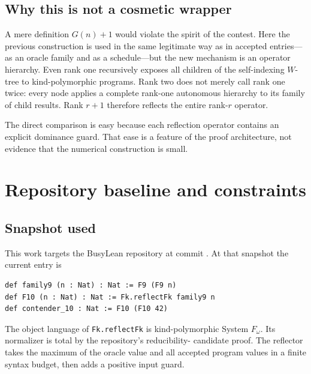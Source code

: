 \documentclass[11pt,oneside]{article}
\theoremstyle{definition}
\newcommand{\code}[1]{\texttt{#1}}
\newcommand{\BusyLean}{\textsf{BusyLean}}
\begin{document}
\subsection{Why this is not a cosmetic wrapper}

A mere definition $G(n)+1$ would violate the spirit of the contest.  Here the
previous construction is used in the same legitimate way as in accepted
entries---as an oracle family and as a schedule---but the new mechanism is an
operator hierarchy.  Even rank one recursively exposes all children of the
self-indexing $W$-tree to kind-polymorphic programs.  Rank two does not merely
call rank one twice: every node applies a complete rank-one autonomous
hierarchy to its family of child results.  Rank $r+1$ therefore reflects the
entire rank-$r$ operator.

The direct comparison is easy because each reflection operator contains an
explicit dominance guard.  That ease is a feature of the proof architecture,
not evidence that the numerical construction is small.

\section{Repository baseline and constraints}

\subsection{Snapshot used}

This work targets the \BusyLean{} repository at commit
.  At that snapshot the current
entry is
\begin{verbatim}
def family9 (n : Nat) : Nat := F9 (F9 n)
def F10 (n : Nat) : Nat := Fk.reflectFk family9 n
def contender_10 : Nat := F10 (F10 42)
\end{verbatim}
The object language of \code{Fk.reflectFk} is kind-polymorphic System
$F_\omega$.  Its normalizer is total by the repository's reducibility-
candidate proof.  The reflector takes the maximum of the oracle value and all
accepted program values in a finite syntax budget, then adds a positive input
guard.
\end{document}
